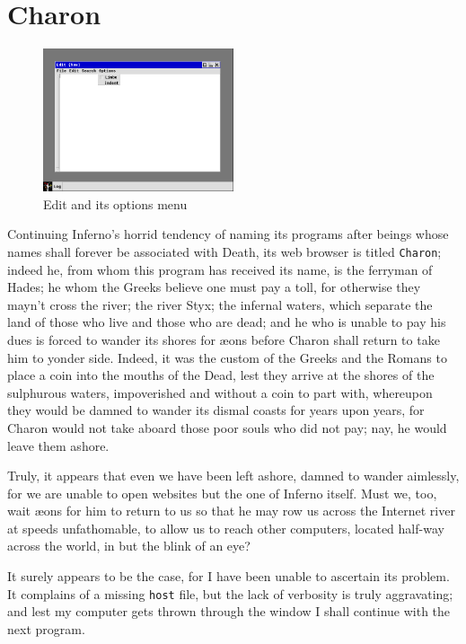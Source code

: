 \documentclass[a5paper,twoside,12pt]{report}
\begin{document}
    \section*{Charon}

    \begin{figure}
      \centering
      \includegraphics[width=0.5\textwidth]{imgs/edit.png}
      \caption{Edit and its options menu}
    \end{figure}

    Continuing Inferno's horrid tendency of naming its programs after beings whose names shall forever be associated with Death, its web browser is titled \texttt{Charon}; indeed he, from whom this program has received its name, is the ferryman of Hades; he whom the Greeks believe one must pay a toll, for otherwise they mayn't cross the river; the river Styx; the infernal waters, which separate the land of those who live and those who are dead; and he who is unable to pay his dues is forced to wander its shores for æons before Charon shall return to take him to yonder side. Indeed, it was the custom of the Greeks and the Romans to place a coin into the mouths of the Dead, lest they arrive at the shores of the sulphurous waters, impoverished and without a coin to part with, whereupon they would be damned to wander its dismal coasts for years upon years, for Charon would not take aboard those poor souls who did not pay; nay, he would leave them ashore.

    Truly, it appears that even we have been left ashore, damned to wander aimlessly, for we are unable to open websites but the one of Inferno itself. Must we, too, wait æons for him to return to us so that he may row us across the Internet river at speeds unfathomable, to allow us to reach other computers, located half-way across the world, in but the blink of an eye?

    It surely appears to be the case, for I have been unable to ascertain its problem. It complains of a missing \texttt{host} file, but the lack of verbosity is truly aggravating; and lest my computer gets thrown through the window I shall continue with the next program.
\end{document}
